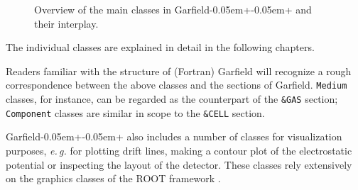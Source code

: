 \begin{figure}
{
  }
  \caption{Overview of the main classes in 
           Garfield\kern-0.05em+\kern-0.05em+ and their interplay.}
  \label{Fig:OverviewClasses}
\end{figure}

The individual classes are explained in detail in the following chapters. 

Readers familiar with the structure 
of (Fortran) Garfield \cite{GarfieldFortran} will recognize a 
rough correspondence between 
the above classes and the sections of Garfield. 
\texttt{Medium} classes, for instance, can be regarded as the counterpart 
of the \texttt{\&GAS} section; 
\texttt{Component} classes are similar in 
scope to the \texttt{\&CELL} section.  
 
Garfield\kern-0.05em+\kern-0.05em+ also includes a number of classes for visualization purposes, 
\textit{e.\,g.} for plotting drift lines, making a contour plot of the electrostatic 
potential or inspecting the layout of the detector.   
These classes rely extensively on the graphics classes of the 
ROOT framework \cite{ROOT}.

